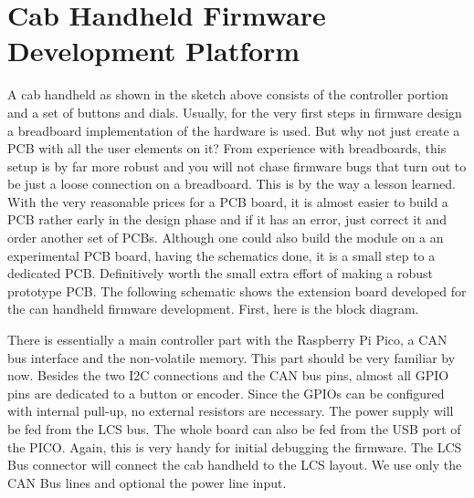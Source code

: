 \chapter{Cab Handheld Firmware Development Platform}

A cab handheld as shown in the sketch above consists of the controller portion and a set of buttons and dials. Usually, for the very first steps in firmware design a breadboard implementation of the hardware is used. But why not just create a PCB with all the user elements on it? From experience with breadboards, this setup is by far more robust and you will not chase firmware bugs that turn out to be just a loose connection on a breadboard. This is by the way a lesson learned. With the very reasonable prices for a PCB board, it is almost easier to build a PCB rather early in the design phase and if it has an error, just correct it and order another set of PCBs. Although one could also build the module on a an experimental PCB board, having the schematics done, it is a small step to a dedicated PCB. Definitively worth the small extra effort of making a robust prototype PCB. The following schematic shows the extension board developed for the can handheld firmware development. First, here is the block diagram.


There is essentially a main controller part with the Raspberry Pi Pico, a CAN bus interface and the non-volatile memory. This part should be very familiar by now. Besides the two I2C connections and the CAN bus pins, almost all GPIO pins are dedicated to a button or encoder. Since the GPIOs can be configured with internal pull-up, no external resistors are necessary. The power supply will be fed from the LCS bus. The whole board can also be fed from the USB port of the PICO. Again, this is very handy for initial debugging the firmware. The LCS Bus connector will connect the cab handheld to the LCS layout. We use only the CAN Bus lines and optional the power line input.


